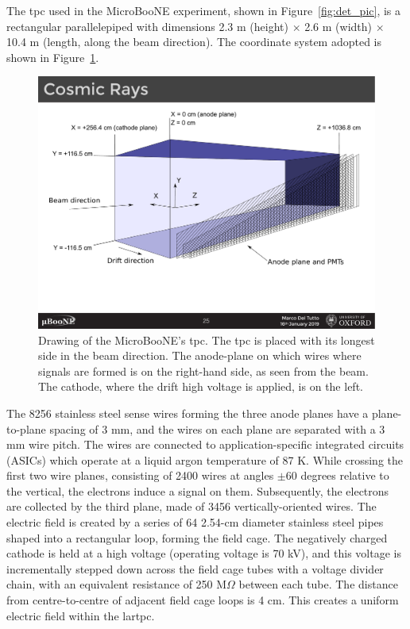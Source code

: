 The \acrshort{tpc} used in the MicroBooNE experiment, shown in Figure~\ref{fig:det_pic}, is a rectangular parallelepiped with dimensions 2.3 m (height) $\times$ 2.6 m (width) $\times$ 10.4 m (length, along the beam direction). The coordinate system adopted is shown in Figure~\ref{fig:tpc_coordinates}. 
\begin{figure}[]
\centering
\includegraphics[width=.90\textwidth]{images/MicroBooNE/tpc_coordinates}
\caption[MicroBooNE TPC Coordinate System]{Drawing of the MicroBooNE's \acrshort{tpc}. The \acrshort{tpc} is placed with its longest side in the beam direction. The anode-plane on which wires where signals are formed is on the right-hand side, as seen from the beam. The cathode, where the drift high voltage is applied, is on the left.}
\label{fig:tpc_coordinates}
\end{figure}
The 8256 stainless steel sense wires forming the three anode planes have a plane-to-plane spacing of 3 mm, and the wires on each plane are separated with a 3 mm wire pitch. The wires are connected to application-specific integrated circuits (ASICs) which operate at a liquid argon temperature of 87 K. 
While crossing the first two wire planes, consisting of 2400 wires at angles $\pm$60 degrees relative to the vertical, the electrons induce a signal on them. Subsequently, the electrons are collected by the third plane, made of 3456 vertically-oriented wires.
The electric field is created by a series of 64 2.54-cm diameter stainless steel pipes shaped into a rectangular loop, forming the field cage. The negatively charged cathode is held at a high voltage (operating voltage is 70 kV), and this voltage is incrementally stepped down across the field cage tubes with a voltage divider chain, with an equivalent resistance of 250 M$\Omega$ between each tube. The distance from centre-to-centre of adjacent field cage loops is 4 cm. This creates a uniform electric field within the \acrshort{lartpc}.





